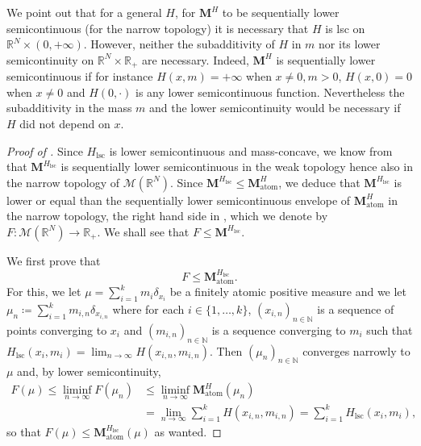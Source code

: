 \documentclass[JEP,XML,SOM,Unicode,published]{cedram}
\theoremstyle{plain}
\theoremstyle{definition}
\newcommand{\N}{\mathbb{N}}
\newcommand{\R}{\mathbb{R}}
\newcommand{\Mspace}{\mathscr{M}}
\newcommand{\mass}{\boldsymbol{M}}
\newcommand{\lsc}{\mathrm{lsc}}
\begin{document}
We point out that for a general $H$, for \(\mass^H\) to be sequentially lower semicontinuous (for the narrow topology) it is necessary that $H$ is lsc on $\R^N \times (0,+\infty)$. However, neither the subadditivity of \(H\) in $m$ nor its lower semicontinuity on $\R^N \times \R_+$ are necessary. Indeed, \(\mass^H\) is sequentially lower semicontinuous if for instance \(H(x,m)=+\infty\) when \(x\neq 0, m > 0\), \(H(x,0) = 0\) when $x\neq 0$ and \(H(0,\cdot)\) is any lower semicontinuous function. Nevertheless the subadditivity in the mass $m$ and the lower semicontinuity would be necessary if \(H\) did not depend on \(x\).

\begin{proof}[Proof of ]
Since \(H_\lsc\) is lower semicontinuous and mass-concave, we know from  that \(\mass^{H_\lsc}\) is sequentially lower semicontinuous in the weak topology hence also in the narrow topology of \(\Mspace(\R^N)\). Since \(\mass^{H_\lsc}\leq\mass_\mathrm{atom}^H\), we deduce that \(\mass^{H_\lsc}\) is lower or equal than the sequentially lower semicontinuous envelope of \(\mass_\mathrm{atom}^H\) in the narrow topology, \ie the right hand side in , which we denote by \(F:\Mspace(\R^N)\to\R_+\). We shall see that \(F\leq\mass^{H_\lsc}\).

We first prove that
\begin{equation}\label{FleqHlsc}
F\leq\mass_\mathrm{atom}^{H_\lsc}.
\end{equation}
For this, we let \(\mu=\sum_{i=1}^km_i\delta_{x_i}\) be a finitely atomic positive measure and we let \(\mu_n\coloneqq\sum_{i=1}^k m_{i,n}\delta_{x_{i,n}}\) where for each \(i\in\{1,\dots,k\}\), \((x_{i,n})_{n\in\N}\) is a sequence of points converging to \(x_i\) and \((m_{i,n})_{n\in\N}\) is a sequence converging to \(m_i\) such that \({H_\lsc}(x_i,m_i)=\lim_{n\to\infty}H(x_{i,n},m_{i,n})\). Then \((\mu_n)_{n\in\N}\) converges narrowly to \(\mu\) and, by lower semicontinuity,
\begin{align*}
F(\mu)\leq\liminf_{n\to\infty}F(\mu_n)&\leq\liminf_{n\to\infty}\mass_\mathrm{atom}^H(\mu_n)\\
&=\lim_{n\to\infty}\sum_{i=1}^k H(x_{i,n},m_{i,n})=\sum_{i=1}^k{H_\lsc}(x_i,m_i),
\end{align*}
so that \(F(\mu)\leq\mass_\mathrm{atom}^{H_\lsc}(\mu)\) as wanted.


\end{proof}
\end{document}
